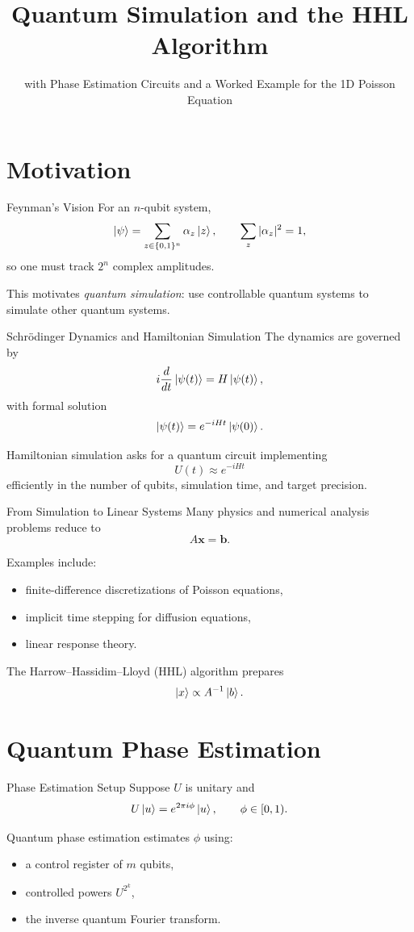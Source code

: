 \documentclass[aspectratio=169]{beamer}
\title{Quantum Simulation and the HHL Algorithm}
\subtitle{with Phase Estimation Circuits and a Worked Example for the 1D Poisson Equation}
\author{}
\date{}
\begin{document}
\frame{\titlepage}

\section{Motivation}

\begin{frame}{Feynman's Vision}
For an \(n\)-qubit system,
\[
\ket{\psi}=\sum_{z\in\{0,1\}^n} \alpha_z \ket{z},
\qquad
\sum_z |\alpha_z|^2=1,
\]
so one must track \(2^n\) complex amplitudes.

\medskip

This motivates \emph{quantum simulation}: use controllable quantum systems to simulate other quantum systems.
\end{frame}

\begin{frame}{Schrödinger Dynamics and Hamiltonian Simulation}
The dynamics are governed by
\[
i\frac{d}{dt}\ket{\psi(t)} = H\ket{\psi(t)},
\]
with formal solution
\[
\ket{\psi(t)} = e^{-iHt}\ket{\psi(0)}.
\]

Hamiltonian simulation asks for a quantum circuit implementing
\[
U(t)\approx e^{-iHt}
\]
efficiently in the number of qubits, simulation time, and target precision.
\end{frame}

\begin{frame}{From Simulation to Linear Systems}
Many physics and numerical analysis problems reduce to
\[
A\bm{x}=\bm{b}.
\]

Examples include:
\begin{itemize}
    \item finite-difference discretizations of Poisson equations,
    \item implicit time stepping for diffusion equations,
    \item linear response theory.
\end{itemize}

The Harrow--Hassidim--Lloyd (HHL) algorithm prepares
\[
\ket{x}\propto A^{-1}\ket{b}.
\]
\end{frame}

\section{Quantum Phase Estimation}

\begin{frame}{Phase Estimation Setup}
Suppose \(U\) is unitary and
\[
U\ket{u}=e^{2\pi i \phi}\ket{u},
\qquad
\phi\in[0,1).
\]

Quantum phase estimation estimates \(\phi\) using:
\begin{itemize}
    \item a control register of \(m\) qubits,
    \item controlled powers \(U^{2^k}\),
    \item the inverse quantum Fourier transform.
\end{itemize}
\end{frame}
\end{document}
